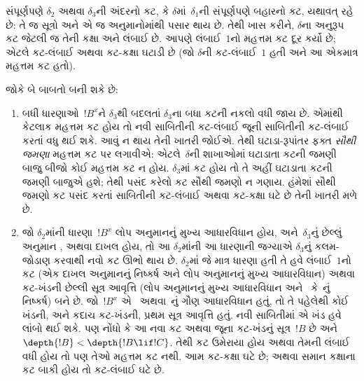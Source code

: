 સંપૂર્ણપણે
$\delta_2$ અથવા
$\delta_3$ની અંદરનો
કટ, કે
$\delta$માં~$\delta_1$ની
સંપૂર્ણપણે બહારનો
કટ, યથાવત્
રહે છે: તે
જ સૂત્રો
અને એ જ
અનુમાનોમાંથી
પસાર થાય છે.
તેથી ખાસ કરીને,
$\delta$ના અનુરૂપ
કટ જેટલી જ
તેની કક્ષા અને
લંબાઈ છે.
આપણે લંબાઈ~$1$નો
મહત્તમ કટ
દૂર કર્યો છે;
એટલે કટ-લંબાઈ
અથવા કટ-કક્ષા
ઘટાડી છે (જો
$\delta$ની કટ-લંબાઈ~$1$
હતી અને આ
એકમાત્ર મહત્તમ
કટ હતો).

જોકે બે બાબતો
બની શકે છે:
\begin{enumerate}
  \item બધી
  ધારણાઓ~$!B^x$ને
  $\delta_3$થી બદલતાં
  $\delta_3$ના બધા
  કટની નકલો વધી
  જાય છે. એમાંથી
  કેટલાક મહત્તમ
  કટ હોય તો
  નવી સાબિતીની
  કટ-લંબાઈ જૂની
  સાબિતીની કટ-લંબાઈ
  કરતાં વધુ થઈ
  શકે. આવું
  ન થાય તેની
  ખાતરી જોઈએ.
  તેથી ઘટાડા-રૂપાંતર
  ફક્ત \emph{સૌથી
  જમણા} મહત્તમ
  કટ પર લગાવીએ:
  એટલે~$\delta$ની
  શાખાઓમાં ઘટાડાતા
  કટની જમણી બાજુ
  બીજો કોઈ
  મહત્તમ કટ ન
  હોય. $\delta_3$માં
  કટ હોય તો
  તે અહીં ઘટાડાતા
  કટની જમણી
  બાજુએ હશે;
  તેથી પસંદ કરેલો
  કટ સૌથી જમણો
  ન ગણાય. હંમેશાં
  સૌથી જમણો
  કટ પસંદ કરતાં
  સાબિતીની
  કટ-લંબાઈ અથવા
  કટ-કક્ષા ઘટે
  છે તેની ખાતરી
  મળે છે.
  \item જો
  $\delta_2$માંની
  ધારણા~$!B^x$
  લોપ
  અનુમાનનું મુખ્ય
  આધારવિધાન હોય,
  અને~$\delta_3$નું
  છેલ્લું અનુમાન
  \Elim{\lor},
  \Elim{\lexists}
  અથવા દાખલ
  હોય, તો આ
  $\delta_2$માંની આ
  ધારણાની જગ્યાએ
  $\delta_3$નું
  કલમ-જોડાણ
  કરવાથી નવો
  કટ ઊભો થાય
  છે. $\delta_2$માં
  જે માત્ર ધારણા
  હતી તે હવે
  લંબાઈ~$1$નો
  કટ (એક
  દાખલ
  અનુમાનનું નિષ્કર્ષ
  અને લોપ
  અનુમાનનું મુખ્ય
  આધારવિધાન) અથવા
  કટ-ખંડની
  છેલ્લી સૂત્ર
  આવૃત્તિ
  (લોપ
  અનુમાનનું
  મુખ્ય આધારવિધાન
  અને~\Elim{\lor}
  કે~\Elim{\lexists}નું
  નિષ્કર્ષ) બને
  છે. જો~$!B^x$
  એ~\Elim{\lor}
  અથવા~\Elim{\lexists}નું
  ગૌણ આધારવિધાન
  હતું, તો તે
  પહેલેથી કોઈ
  ખંડની, અને
  કદાચ કટ-ખંડની,
  પ્રથમ સૂત્ર
  આવૃત્તિ હતું.
  નવી સાબિતીમાં
  એ ખંડ હવે
  લાંબો થઈ શકે.
  પણ નોંધો કે
  આ નવા કટ
  અથવા જૂના
  કટ-ખંડનું
  સૂત્ર~$!B$
  છે અને
  $\depth{!B} < \depth{!B \lif !C}$.
  તેથી કટ ઉમેરાયા
  હોય અથવા તેમની
  લંબાઈ વધી હોય
  તો પણ તેઓ
  મહત્તમ કટ નથી.
  આમ કટ-કક્ષા
  ઘટે છે; અથવા
  સમાન કક્ષાના
  કટ બાકી હોય
  તો કટ-લંબાઈ
  ઘટે છે.
\end{enumerate}

